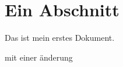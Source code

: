 \documentclass{scrartcl}
\begin{document}
\section{Ein Abschnitt}
Das ist mein erstes Dokument.

mit einer änderung
\end{document}
